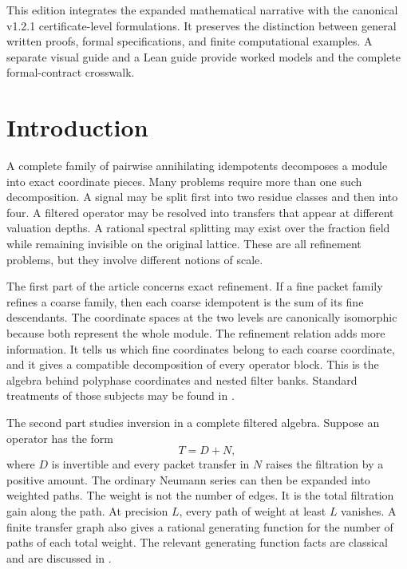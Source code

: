 \documentclass[11pt,a4paper]{article}
\theoremstyle{definition}
\theoremstyle{remark}
\theoremstyle{definition}\newtheorem{construction}[theorem]{Construction}\newtheorem{certificate}[theorem]{Numerical Certificate}
\theoremstyle{remark}\newtheorem{boundary}[theorem]{Boundary}
\begin{document}
\noindent This edition integrates the expanded mathematical narrative with the canonical v1.2.1 certificate-level formulations.  It preserves the distinction between general written proofs, formal specifications, and finite computational examples.  A separate visual guide and a Lean guide provide worked models and the complete formal-contract crosswalk.
\tableofcontents\listoffigures\listoftables\clearpage
\section{Introduction}

A complete family of pairwise annihilating idempotents decomposes a module into exact coordinate pieces.  Many problems require more than one such decomposition.  A signal may be split first into two residue classes and then into four.  A filtered operator may be resolved into transfers that appear at different valuation depths.  A rational spectral splitting may exist over the fraction field while remaining invisible on the original lattice.  These are all refinement problems, but they involve different notions of scale.

The first part of the article concerns exact refinement.  If a fine packet family refines a coarse family, then each coarse idempotent is the sum of its fine descendants.  The coordinate spaces at the two levels are canonically isomorphic because both represent the whole module.  The refinement relation adds more information.  It tells us which fine coordinates belong to each coarse coordinate, and it gives a compatible decomposition of every operator block.  This is the algebra behind polyphase coordinates and nested filter banks.  Standard treatments of those subjects may be found in \cite{Vaidyanathan1993,Daubechies1992}.

The second part studies inversion in a complete filtered algebra.  Suppose an operator has the form
\[
T=D+N,
\]
where $D$ is invertible and every packet transfer in $N$ raises the filtration by a positive amount.  The ordinary Neumann series can then be expanded into weighted paths.  The weight is not the number of edges.  It is the total filtration gain along the path.  At precision $L$, every path of weight at least $L$ vanishes.  A finite transfer graph also gives a rational generating function for the number of paths of each total weight.  The relevant generating function facts are classical and are discussed in \cite{Stanley2012}.
\end{document}
